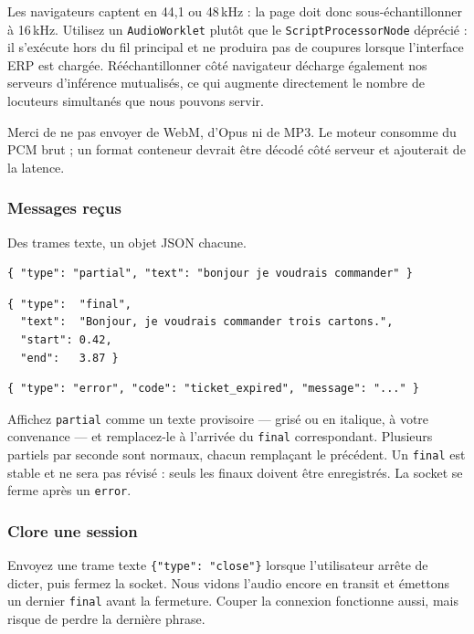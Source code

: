 \documentclass[11pt,a4paper]{article}
\begin{document}
Les navigateurs captent en 44,1 ou 48\,kHz : la page doit donc sous-échantillonner à
16\,kHz. Utilisez un \texttt{AudioWorklet} plutôt que le \texttt{ScriptProcessorNode}
déprécié : il s'exécute hors du fil principal et ne produira pas de coupures lorsque
l'interface ERP est chargée. Rééchantillonner côté navigateur décharge également nos
serveurs d'inférence mutualisés, ce qui augmente directement le nombre de locuteurs
simultanés que nous pouvons servir.

Merci de ne pas envoyer de WebM, d'Opus ni de MP3. Le moteur consomme du PCM brut ; un
format conteneur devrait être décodé côté serveur et ajouterait de la latence.

\subsubsection*{Messages reçus}

Des trames texte, un objet JSON chacune.

\begin{lstlisting}
{ "type": "partial", "text": "bonjour je voudrais commander" }
\end{lstlisting}

\begin{lstlisting}
{ "type":  "final",
  "text":  "Bonjour, je voudrais commander trois cartons.",
  "start": 0.42,
  "end":   3.87 }
\end{lstlisting}

\begin{lstlisting}
{ "type": "error", "code": "ticket_expired", "message": "..." }
\end{lstlisting}

Affichez \texttt{partial} comme un texte provisoire — grisé ou en italique, à votre
convenance — et remplacez-le à l'arrivée du \texttt{final} correspondant. Plusieurs
partiels par seconde sont normaux, chacun remplaçant le précédent. Un \texttt{final} est
stable et ne sera pas révisé : seuls les finaux doivent être enregistrés. La socket se
ferme après un \texttt{error}.

\subsubsection*{Clore une session}

Envoyez une trame texte \texttt{\{"type": "close"\}} lorsque l'utilisateur arrête de
dicter, puis fermez la socket. Nous vidons l'audio encore en transit et émettons un
dernier \texttt{final} avant la fermeture. Couper la connexion fonctionne aussi, mais
risque de perdre la dernière phrase.
\end{document}
